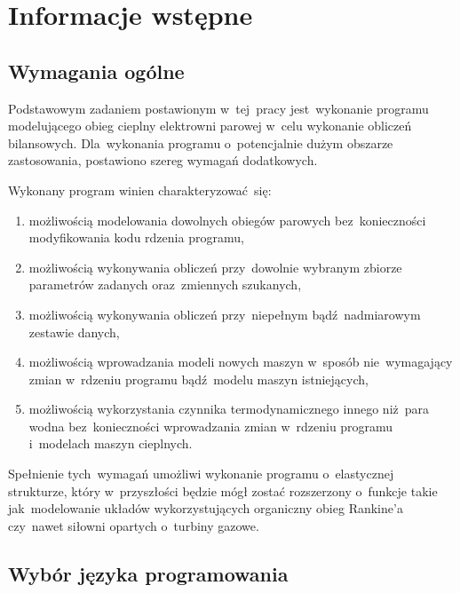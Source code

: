 \section{Informacje wstępne}

\subsection{Wymagania ogólne}

Podstawowym zadaniem postawionym w~tej~pracy jest~wykonanie programu
modelującego obieg cieplny elektrowni parowej w~celu wykonanie obliczeń
bilansowych. Dla~wykonania programu o~potencjalnie dużym obszarze
zastosowania, postawiono szereg wymagań dodatkowych.

Wykonany program winien charakteryzować~się:

\begin{enumerate}

	\item możliwością modelowania dowolnych obiegów parowych
	bez~konieczności modyfikowania kodu rdzenia programu,

	\item możliwością wykonywania obliczeń przy~dowolnie wybranym
	zbiorze parametrów zadanych oraz~zmiennych szukanych,

	\item możliwością wykonywania obliczeń przy~niepełnym
	bądź~nadmiarowym zestawie danych,

	\item możliwością wprowadzania modeli nowych maszyn w~sposób
	nie~wymagający zmian w~rdzeniu programu bądź~modelu maszyn
	istniejących,

	\item możliwością wykorzystania czynnika termodynamicznego innego
	niż~para wodna bez~konieczności wprowadzania zmian w~rdzeniu
	programu i~modelach maszyn cieplnych.

\end{enumerate}

Spełnienie tych~wymagań umożliwi wykonanie programu o~elastycznej
strukturze, który w~przyszłości będzie mógł zostać rozszerzony o~funkcje
takie jak~modelowanie układów wykorzystujących organiczny obieg
Rankine'a czy~nawet siłowni opartych o~turbiny gazowe.


\subsection{Wybór języka programowania}

